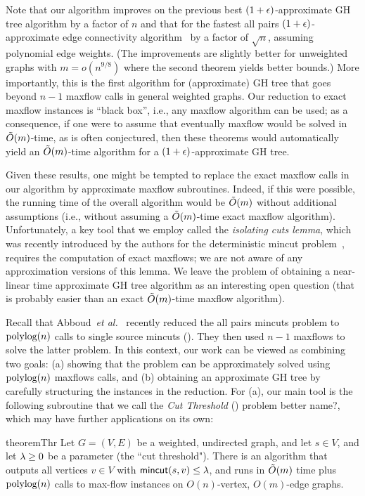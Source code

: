 Note that our algorithm improves on the previous best $(1+\epsilon)$-approximate GH tree algorithm by a factor of $n$ and that for the fastest all pairs $(1+\epsilon)$-approximate edge connectivity algorithm~\cite{AbboudKT20} by a factor of $\sqrt{n}$, assuming polynomial edge weights. (The improvements are slightly better for unweighted graphs with $m=o(n^{9/8})$ where the second theorem yields better bounds.) More importantly, this is the first algorithm for (approximate) GH tree that goes beyond $n-1$ maxflow calls in general weighted graphs. Our reduction to exact maxflow instances is ``black box'', i.e., any maxflow algorithm can be used; as a consequence, if one were to assume that eventually maxflow would be solved in $\tilde{O}(m)$-time, as is often conjectured, then these theorems would automatically yield an $\tilde{O}(m)$-time algorithm for a $(1+\epsilon)$-approximate GH tree.

Given these results, one might be tempted to replace the exact maxflow calls in our algorithm by approximate maxflow subroutines. Indeed, if this were possible, the running time of the overall algorithm would be $\tilde{O}(m)$ without additional assumptions (i.e., without assuming a $\tilde{O}(m)$-time exact maxflow algorithm). Unfortunately, a key tool that we employ called the {\em isolating cuts lemma}, which was recently introduced by the authors for the deterministic mincut problem~\cite{LiP20}, requires the computation of exact maxflows; we are not aware of any approximation versions of this lemma. We leave the problem of obtaining a near-linear time approximate GH tree algorithm as an interesting open question (that is probably easier than an exact $\tilde{O}(m)$-time maxflow algorithm).


Recall that Abboud~{\em et al.}~\cite{AbboudKT20b} recently reduced the all pairs mincuts problem to $\textup{polylog}(n)$ calls to single source mincuts (\ssc). They then used $n-1$ maxflows to solve the latter problem. In this context, our work can be viewed as combining two goals: (a) showing that the \ssc problem can be approximately solved using $\textup{polylog}(n)$ maxflows calls, and (b) obtaining an approximate GH tree by carefully structuring the \ssc instances in the reduction. For (a), our main tool is the following subroutine that we call the {\em Cut Threshold} (\ct) problem \alert{better name?}, which may have further applications on its own:

\begin{restatable}{theorem}{Thr}
Let $G=(V,E)$ be a weighted, undirected graph, and let $s\in V$, and let $\lambda\ge0$ be a parameter (the ``cut threshold"). There is an algorithm that outputs all vertices $v\in V$ with $\textsf{\textup{mincut}}(s,v)\le\lambda$, and runs in $\tilde{O}(m)$ time plus $\textup{polylog}(n)$ calls to max-flow instances on $O(n)$-vertex, $O(m)$-edge graphs.
\end{restatable}


